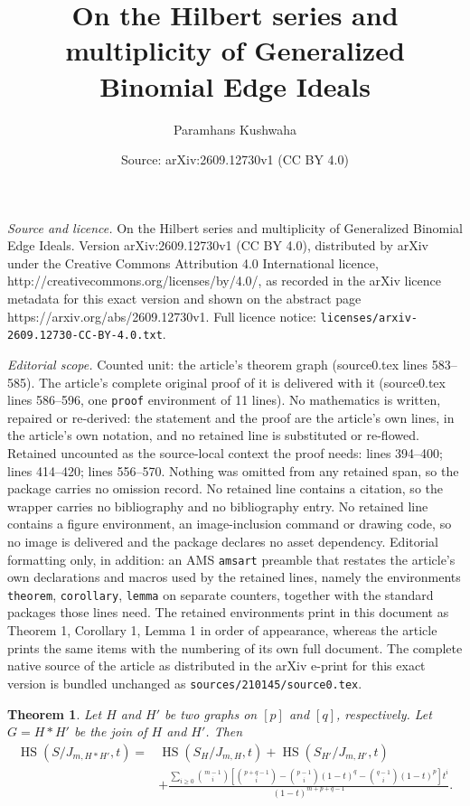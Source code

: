 \documentclass[10pt,a4paper]{amsart}
\title{On the Hilbert series and multiplicity of Generalized Binomial Edge Ideals}
\author{Paramhans Kushwaha}
\date{Source: arXiv:2609.12730v1 (CC BY 4.0)}
\newtheorem{theorem}{Theorem}
\newcommand \hs{\operatorname{HS}}
\begin{document}
\maketitle

\noindent\emph{Source and licence.} On the Hilbert series and multiplicity of Generalized Binomial Edge Ideals. Version arXiv:2609.12730v1 (CC BY 4.0), distributed by arXiv under the Creative Commons Attribution 4.0 International licence, http://creativecommons.org/licenses/by/4.0/, as recorded in the arXiv licence metadata for this exact version and shown on the abstract page https://arxiv.org/abs/2609.12730v1. Full licence notice: \texttt{licenses/arxiv-2609.12730-CC-BY-4.0.txt}.\par\smallskip

\noindent\textit{Editorial scope.} Counted unit: the article's theorem graph (source0.tex lines 583--585). The article's complete original proof of it is delivered with it (source0.tex lines 586--596, one \texttt{proof} environment of 11 lines). No mathematics is written, repaired or re-derived: the statement and the proof are the article's own lines, in the article's own notation, and no retained line is substituted or re-flowed.  Retained uncounted as the source-local context the proof needs: lines 394--400; lines 414--420; lines 556--570.  Nothing was omitted from any retained span, so the package carries no omission record.  No retained line contains a citation, so the wrapper carries no bibliography and no bibliography entry.  No retained line contains a figure environment, an image-inclusion command or drawing code, so no image is delivered and the package declares no asset dependency.  Editorial formatting only, in addition: an AMS \texttt{amsart} preamble that restates the article's own declarations and macros used by the retained lines, namely the environments \texttt{theorem}, \texttt{corollary}, \texttt{lemma} on separate counters, together with the standard packages those lines need.  The retained environments print in this document as Theorem 1, Corollary 1, Lemma 1 in order of appearance, whereas the article prints the same items with the numbering of its own full document.  The complete native source of the article as distributed in the arXiv e-print for this exact version is bundled unchanged as \texttt{sources/210145/source0.tex}.
 \begin{theorem}\label{thm: hs of join of graphs}
     Let $H$  and $H'$ be two graphs on $[p]$ and $[q]$, respectively. Let $G=H*H'$ be the join of $H$ and $H'$. Then 
     \begin{align*}
        \hs(S/J_{m,H*H'},t)=&\hs(S_H/J_{m,H},t)+\hs(S_{H'}/J_{m,H'},t)\\
        & +\frac{\sum_{i\geq 0}\binom{m-1}{i}\left[\binom{p+q-1}{i}-\binom{p-1}{i}(1-t)^q-\binom{q-1}{i}(1-t)^p\right]t^i}{(1-t)^{m+p+q-1}}.
    \end{align*}
 \end{theorem}
\end{document}
